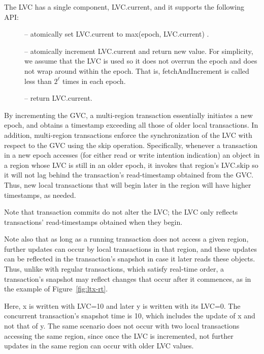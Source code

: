 The LVC has a single component, LVC.current, and it supports the following API:
\begin{description}
\item[] -- atomically set LVC.current to max(epoch, LVC.current) .

\item[] -- atomically increment LVC.current and return new
value.
For simplicity, we assume that the LVC is used so it does not overrun the epoch
and does not wrap around within the epoch. That is, fetchAndIncrement is called
less than $2^\ell$ times in each epoch.

\item[] -- return LVC.current.
\end{description}

By incrementing the GVC, a multi-region transaction essentially initiates a new
epoch, and obtains a timestamp exceeding all those of older local transactions.
In addition, multi-region transactions enforce the synchronization of the LVC
with respect to the GVC using the skip operation. Specifically, whenever a
transaction in a new epoch accesses (for either read or write intention
indication) an object in a region whose LVC is still in an older epoch, it
invokes that region's LVC.skip so it will not lag behind the transaction's
read-timestamp obtained from the GVC. Thus, new local transactions that will
begin later in the region will have higher timestamps, as needed.

Note that transaction commits do not alter the LVC; the LVC only reflects
transactions' read-timestamps obtained when they  begin.

Note also that as long as a running transaction does not access a given region,
further updates can occur by local transactions in that region, and these
updates can be reflected in the transaction's snapshot in case it later reads
these objects. Thus, unlike with regular transactions, which satisfy real-time
order, a transaction's snapshot may reflect changes that occur after it
commences, as in the example of Figure~\ref{fig:ltx-rt}.

Here, x is written with LVC=10 and later y is written with its LVC=0. The
concurrent transaction's snapshot time is 10, which includes the update of x and
not that of y. The same scenario does not occur with two local transactions
accessing the same region, since once the LVC is incremented, not further
updates in the same region can occur with older LVC values.



